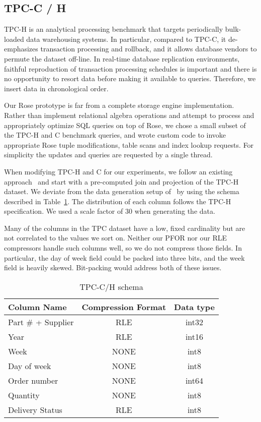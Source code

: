 \documentclass{vldb}
\newcommand{\rows}{Rose\xspace}
\begin{document}
\subsection{TPC-C / H}

TPC-H is an analytical processing benchmark that targets periodically
bulk-loaded data warehousing systems.  In particular, compared to
TPC-C, it de-emphasizes transaction processing and rollback, and it
allows database vendors to permute the dataset off-line.  In real-time
database replication environments, faithful reproduction of
transaction processing schedules is important and there is no
opportunity to resort data before making it available to queries.
Therefore, we insert data in chronological order.

Our \rows prototype is far from a complete storage engine
implementation.  Rather than implement relational algebra operations
and attempt to process and appropriately optimize SQL queries on top
of \rows, we chose a small subset of the TPC-H and C benchmark
queries, and wrote custom code to invoke appropriate \rows tuple
modifications, table scans and index lookup requests.  For simplicity
the updates and queries are requested by a
single thread.

When modifying TPC-H and C for our experiments, we follow an existing
approach~\cite{entropy,bitsForChronos} and start with a pre-computed join
and projection of the TPC-H dataset.  We deviate from the data
generation setup of~\cite{bitsForChronos} by using the schema
described in Table~\ref{tab:tpc-schema}.  The distribution of each
column follows the TPC-H specification.  We used a scale factor of 30
when generating the data.

Many of the columns in the
TPC dataset have a low, fixed cardinality but are not correlated to the values we sort on.
Neither our PFOR nor our RLE compressors handle such columns well, so
we do not compress those fields.  In particular, the day of week field
could be packed into three bits, and the week field is heavily skewed.  Bit-packing would address both of these issues.

\begin{table}
\caption{TPC-C/H schema}
\centering
\label{tab:tpc-schema}
\begin{tabular}{|l|c|c|} \hline
Column Name     & Compression Format &  Data type\\ \hline
Part \# + Supplier & RLE       & int32              \\ \hline
Year            & RLE       & int16              \\\hline
Week            & NONE      & int8               \\\hline
Day of week     & NONE      & int8               \\\hline
Order number    & NONE      & int64              \\\hline
Quantity        & NONE      & int8               \\\hline
Delivery Status & RLE       & int8               \\\hline
\end{tabular}
\end{table}
\end{document}
